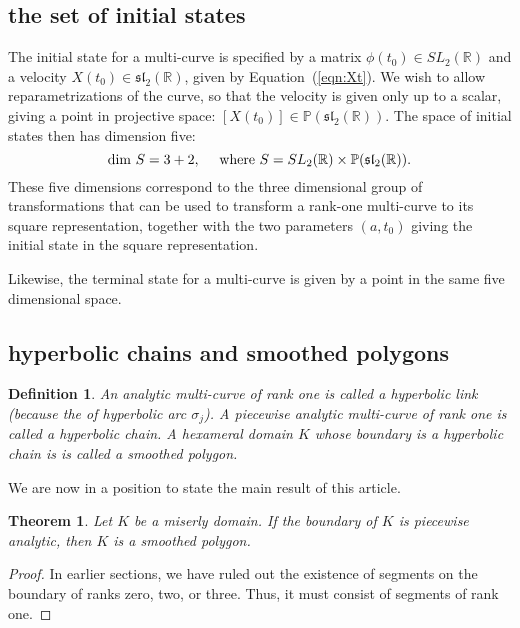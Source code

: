 \documentclass[11pt]{amsart}
\newtheorem{definition}[equation]{Definition}
\newtheorem{thm}[equation]{Theorem}
\newcommand{\ring}[1]{\mathbb{#1}}
\begin{document}
\subsection{the set of initial states}



The initial state for a multi-curve is specified by a matrix
$\phi(t_0)\in SL_2(\ring{R})$ and a velocity
$X(t_0)\in\mathfrak{sl}_2(\ring{R})$, given by
Equation~(\ref{eqn:Xt}).  We wish to allow reparametrizations of the
curve, so that the velocity is given only up to a scalar, giving a
point in projective space:
$[X(t_0)]\in\ring{P}(\mathfrak{sl}_2(\ring{R}))$.  The space of
initial states then has dimension five:
\[
\dim\, S = 3 + 2,\quad\hbox{ where } S = SL_2(\ring{R}) \times\ring{P}(\mathfrak{sl}_2(\ring{R})).
\]
These five dimensions correspond to the three dimensional group of
transformations that can be used to transform a rank-one multi-curve
to its square representation, together with the two parameters $(a,t_0)$
giving the initial state in the square representation.

Likewise, the terminal state for a multi-curve is given by a point
in the same five dimensional space. 





\subsection{hyperbolic chains and smoothed polygons}

\begin{definition}
  An analytic multi-curve of rank one is called a {\it hyperbolic
    link} (because the of hyperbolic arc $\sigma_j$).  A piecewise
  analytic multi-curve of rank one is called a {\it hyperbolic chain}.
  A hexameral domain $K$ whose boundary is a hyperbolic chain is is
  called a smoothed polygon.
\end{definition}

We are now in a position to state the main result of this article.

\begin{thm}  Let $K$ be a miserly domain.  If the boundary of $K$ is piecewise analytic,
then $K$ is a smoothed polygon.
\end{thm}

\begin{proof}  In earlier sections, we have ruled out the existence of segments on the boundary
of ranks zero, two, or three.  Thus, it must consist of segments of rank one.
\end{proof}
\end{document}
